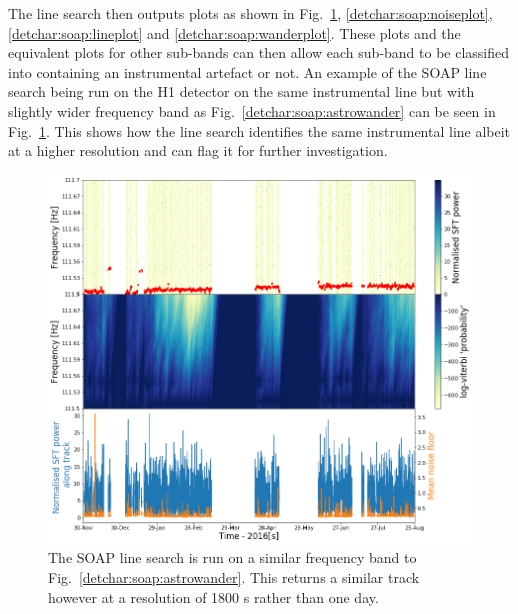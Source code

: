 The line search then outputs plots as shown in Fig.~\ref{detchar:soap:linewander},
\ref{detchar:soap:noiseplot}, \ref{detchar:soap:lineplot} and
\ref{detchar:soap:wanderplot}.  These plots and the equivalent plots for other
sub-bands can then allow each sub-band to be classified into containing an
instrumental artefact or not.  An example of the SOAP line search being run on
the H1 detector on the same instrumental line but with slightly wider frequency
band as Fig.~\ref{detchar:soap:astrowander} can be seen in
Fig.~\ref{detchar:soap:linewander}. This shows how the line search identifies
the same instrumental line albeit at a higher resolution and can flag it for
further investigation.~

%
\begin{figure}[hpt]
	\centering
	\includegraphics[width=\textwidth]{C5_detchar/track_F111_5_111_7_wander_2.png}
	\caption[Example SOAP output for wandering line]{ The SOAP line search is run on a similar frequency band to Fig.~\ref{detchar:soap:astrowander}. This returns a similar track however at a resolution of 1800 s rather than one day.}
	\label{detchar:soap:linewander}
\end{figure}
%

